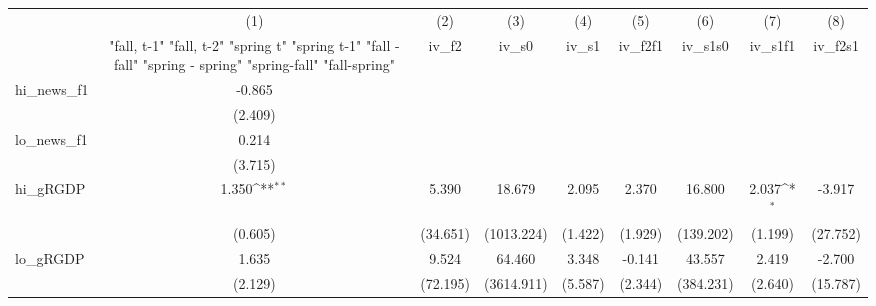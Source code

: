 {
\def\sym#1{\ifmmode^{#1}\else\(^{#1}\)\fi}
\begin{tabular}{l*{8}{c}}
\toprule
            &\multicolumn{1}{c}{(1)}&\multicolumn{1}{c}{(2)}&\multicolumn{1}{c}{(3)}&\multicolumn{1}{c}{(4)}&\multicolumn{1}{c}{(5)}&\multicolumn{1}{c}{(6)}&\multicolumn{1}{c}{(7)}&\multicolumn{1}{c}{(8)}\\
            &\multicolumn{1}{c}{  "fall, t-1" "fall, t-2" "spring t" "spring t-1"  "fall - fall" "spring - spring" "spring-fall" "fall-spring" }&\multicolumn{1}{c}{iv\_f2}&\multicolumn{1}{c}{iv\_s0}&\multicolumn{1}{c}{iv\_s1}&\multicolumn{1}{c}{iv\_f2f1}&\multicolumn{1}{c}{iv\_s1s0}&\multicolumn{1}{c}{iv\_s1f1}&\multicolumn{1}{c}{iv\_f2s1}\\
\midrule
hi\_news\_f1  &      -0.865         &                     &                     &                     &                     &                     &                     &                     \\
            &     (2.409)         &                     &                     &                     &                     &                     &                     &                     \\
\addlinespace
lo\_news\_f1  &       0.214         &                     &                     &                     &                     &                     &                     &                     \\
            &     (3.715)         &                     &                     &                     &                     &                     &                     &                     \\
\addlinespace
hi\_gRGDP    &       1.350\sym{**} &       5.390         &      18.679         &       2.095         &       2.370         &      16.800         &       2.037\sym{*}  &      -3.917         \\
            &     (0.605)         &    (34.651)         &  (1013.224)         &     (1.422)         &     (1.929)         &   (139.202)         &     (1.199)         &    (27.752)         \\
\addlinespace
lo\_gRGDP    &       1.635         &       9.524         &      64.460         &       3.348         &      -0.141         &      43.557         &       2.419         &      -2.700         \\
            &     (2.129)         &    (72.195)         &  (3614.911)         &     (5.587)         &     (2.344)         &   (384.231)         &     (2.640)         &    (15.787)         \\

\end{tabular}}
